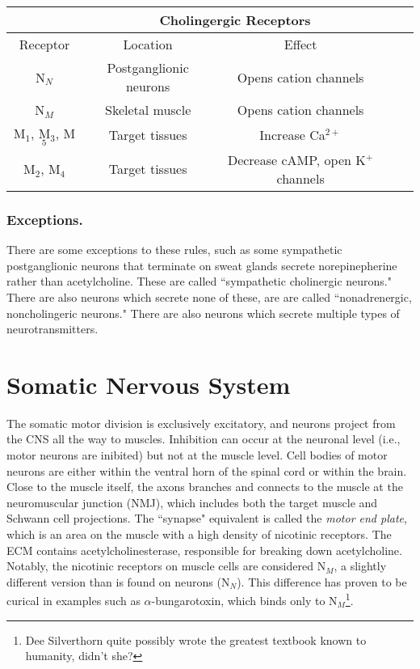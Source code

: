 \documentclass[12pt]{report}
\begin{document}
\begin{table}[!htbp]
\centering
\begin{tabular}{*5c}
\toprule
{} &  \multicolumn{2}{c}{Cholingergic Receptors} & {}\\
\midrule
{Receptor}   & Location & Effect \\
\midrule
N$_N$  &  Postganglionic neurons & Opens cation channels   \\
N$_M$  &  Skeletal muscle  & Opens cation channels  \\
M$_1$, M$_3$, M$_5$   &  Target tissues   & Increase Ca$^{2+}$   \\
M$_2$, M$_4$   &  Target tissues   & Decrease cAMP, open K$^+$ channels   \\
\bottomrule
\end{tabular}
\end{table}


\subsubsection{Exceptions.}
There are some exceptions to these rules, such as some sympathetic postganglionic neurons that terminate on sweat glands secrete norepinepherine rather than acetylcholine. These are called ``sympathetic cholinergic neurons." There are also neurons which secrete none of these, are are called ``nonadrenergic, noncholingeric neurons." There are also neurons which secrete multiple types of neurotransmitters. 

\section{Somatic Nervous System}
The somatic motor division is exclusively excitatory, and neurons project from the CNS all the way to muscles. Inhibition can occur at the neuronal level (i.e., motor neurons are inibited) but not at the muscle level. Cell bodies of motor neurons are either within the ventral horn of the spinal cord or within the brain. Close to the muscle itself, the axons branches and connects to the muscle at the neuromuscular junction (NMJ), which includes both the target muscle and Schwann cell projections. The ``synapse" equivalent is called the \textit{motor end plate}, which is an area on the muscle with a high density of nicotinic receptors. The ECM contains acetylcholinesterase, responsible for breaking down acetylcholine. Notably, the nicotinic receptors on muscle cells are considered N$_M$, a slightly different version than is found on neurons (N$_N$). This difference has proven to be curical in examples such as $\alpha$-bungarotoxin, which binds only to N$_M$\footnote{Dee Silverthorn quite possibly wrote the greatest textbook known to humanity, didn't she?}.
\end{document}
